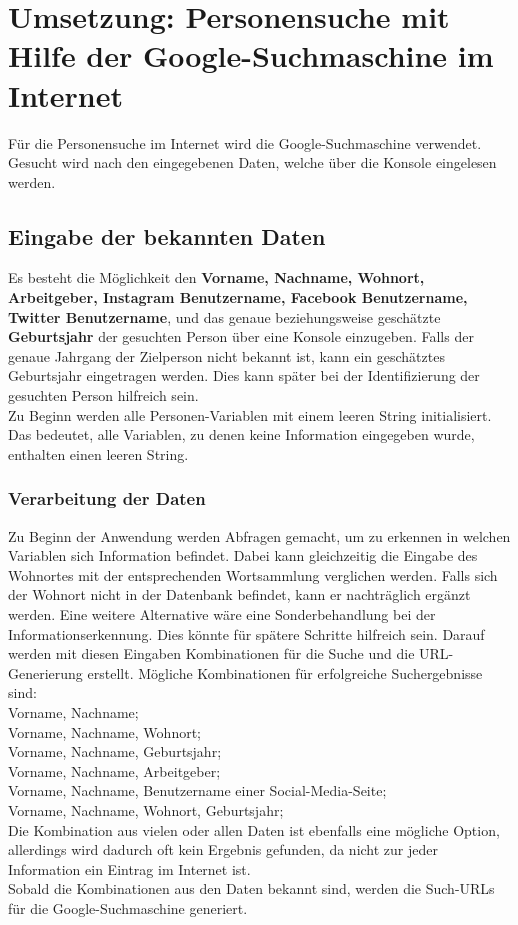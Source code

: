 \section{Umsetzung: Personensuche mit Hilfe der Google-Suchmaschine im Internet}
Für die Personensuche im Internet wird die Google-Suchmaschine verwendet. Gesucht wird nach den eingegebenen Daten, welche über die Konsole eingelesen werden.

	\subsection{Eingabe der bekannten Daten}
	Es besteht die Möglichkeit den \textbf{Vorname, Nachname, Wohnort, Arbeitgeber, Instagram Benutzername, Facebook Benutzername, Twitter Benutzername}, und das genaue beziehungsweise geschätzte \textbf{Geburtsjahr} der gesuchten Person über eine Konsole einzugeben. Falls der genaue Jahrgang der Zielperson nicht bekannt ist, kann ein geschätztes Geburtsjahr eingetragen werden. Dies kann später bei der Identifizierung der gesuchten Person hilfreich sein.\\
	Zu Beginn werden alle Personen-Variablen mit einem leeren String initialisiert. Das bedeutet, alle Variablen, zu denen keine Information eingegeben wurde, enthalten einen leeren String.
	
		\subsubsection{Verarbeitung der Daten}
		Zu Beginn der Anwendung werden Abfragen gemacht, um zu erkennen in welchen Variablen sich Information befindet. Dabei kann gleichzeitig die Eingabe des Wohnortes mit der entsprechenden Wortsammlung verglichen werden. Falls sich der Wohnort nicht in der Datenbank befindet, kann er nachträglich ergänzt werden. Eine weitere Alternative wäre eine Sonderbehandlung bei der Informationserkennung. Dies könnte für spätere Schritte hilfreich sein. Darauf werden mit diesen Eingaben Kombinationen für die Suche und die URL-Generierung erstellt. Mögliche Kombinationen für erfolgreiche Suchergebnisse sind:\\
		Vorname, Nachname;\\
		Vorname, Nachname, Wohnort;\\
		Vorname, Nachname, Geburtsjahr;\\
		Vorname, Nachname, Arbeitgeber;\\
		Vorname, Nachname, Benutzername einer Social-Media-Seite;\\
		Vorname, Nachname, Wohnort, Geburtsjahr;\\
		Die Kombination aus vielen oder allen Daten ist ebenfalls eine mögliche Option, allerdings wird dadurch oft kein Ergebnis gefunden, da nicht zur jeder Information ein Eintrag im Internet ist.\\
		Sobald die Kombinationen aus den Daten bekannt sind, werden die Such-URLs für die Google-Suchmaschine generiert.
			
